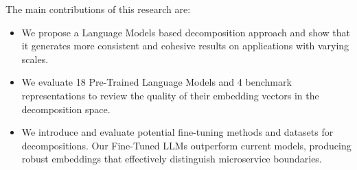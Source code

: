The main contributions of this research are:
\begin{itemize}
    \item We propose a Language Models based decomposition approach and show that it generates more consistent and cohesive results on applications with varying scales. 
    \item We evaluate 18 Pre-Trained Language Models and 4 benchmark representations to review the quality of their embedding vectors in the decomposition space.
    \item We introduce and evaluate potential fine-tuning methods and datasets for decompositions. Our Fine-Tuned LLMs outperform current models, producing robust embeddings that effectively distinguish microservice boundaries.
\end{itemize}